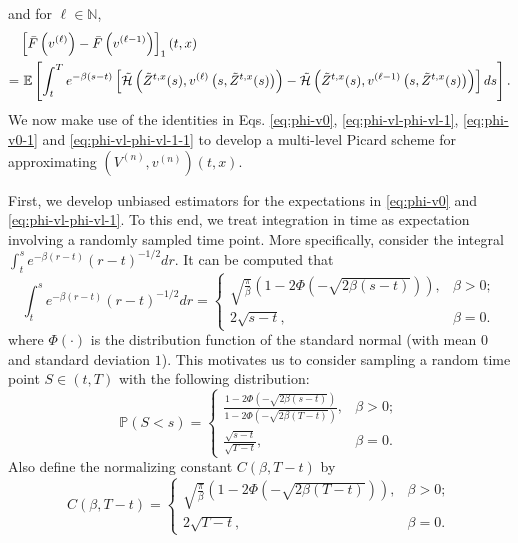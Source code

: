 \documentclass[11pt]{article}
\theoremstyle{definition}
\theoremstyle{plain}
\newcommand{\pr}{\mathbb{P}}
\newcommand{\E}{\mathbb{E}}
\newcommand{\N}{\mathbb{N}}
\newcommand{\cH}{{\cal H}}
\begin{document}
and for $\ell \in \N$,
\begin{align}
& \left[\bar F\left(v^{(\ell)}\right)-\bar F\left(v^{(\ell-1)}\right)\right]_1(t,x) \nonumber \\
=& \ \E\left[\int_t^T e^{-\beta(s-t)} \left[\tilde \cH\left(\tilde{Z}^{t,x}(s), v^{(\ell)}\left(s,\tilde{Z}^{t,x}(s)\right)\right) - \tilde \cH\left(\tilde{Z}^{t,x}(s), v^{(\ell-1)}\left(s,\tilde{Z}^{t,x}(s)\right)\right) \right]  ds \right].
\label{eq:phi-vl-phi-vl-1-1}
\end{align}
We now make use of the identities in Eqs. \eqref{eq:phi-v0}, \eqref{eq:phi-vl-phi-vl-1}, \eqref{eq:phi-v0-1} and \eqref{eq:phi-vl-phi-vl-1-1}
to develop a multi-level Picard scheme 
for approximating $(V^{(n)}, v^{(n)})(t,x)$. 

First, we develop unbiased estimators 
for the expectations in \eqref{eq:phi-v0} and \eqref{eq:phi-vl-phi-vl-1}. To this end, we treat  
integration in time as expectation involving a randomly sampled time point. 
More specifically, consider the integral $\int_t^s e^{-\beta(r-t)} (r-t)^{-1/2} dr$. 
It can be computed that 
\begin{equation}
\int_t^s e^{-\beta(r-t)} (r-t)^{-1/2} dr = \left\{
\begin{array}{ll}
\sqrt{\frac{\pi}{\beta}}\left(1-2\Phi\left(-\sqrt{2\beta(s-t)}\right)\right), & \beta > 0; \\
2\sqrt{s-t}, & \beta = 0.
\end{array}\right.
\end{equation}
where $\Phi(\cdot)$ is the distribution function of the standard normal (with mean $0$ and standard deviation $1$). 
This motivates us to consider sampling a random time point $S \in (t, T)$ 
with the following distribution:
\begin{equation}\label{eq:random-time}
\pr(S < s) = \left\{
\begin{array}{ll}
\frac{1-2\Phi\left(-\sqrt{2\beta(s-t)}\right)}{1-2\Phi\left(-\sqrt{2\beta(T-t)}\right)}, & \beta > 0; \\
\frac{\sqrt{s-t}}{\sqrt{T-t}}, & \beta = 0.
\end{array}\right.
\end{equation}
Also define the normalizing constant $C(\beta, T-t)$ by
\begin{equation}
C(\beta, T-t) = \left\{
\begin{array}{ll}
\sqrt{\frac{\pi}{\beta}}\left(1-2\Phi\left(-\sqrt{2\beta(T-t)}\right)\right), & \beta > 0; \\
2\sqrt{T-t}, & \beta = 0.
\end{array}\right.
\end{equation}
\end{document}

